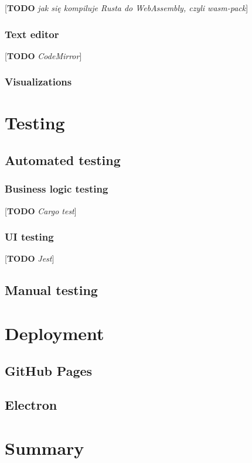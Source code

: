 \documentclass[english,engineering]{wizthesis}
\newcommand{\todo}[1]{{\color{red}[\textbf{TODO} \textit{#1}]}}
\begin{document}
\todo{jak się kompiluje Rusta do WebAssembly, czyli wasm-pack}

\subsection{Text editor}

\todo{CodeMirror}

\subsection{Visualizations}

\chapter{Testing}

\section{Automated testing}

\subsection{Business logic testing}

\todo{Cargo test}

\subsection{UI testing}

\todo{Jest}

\section{Manual testing}

\chapter{Deployment}

\section{GitHub Pages}

\section{Electron}

{\backmatter %
\chapter{Summary}}
\end{document}
